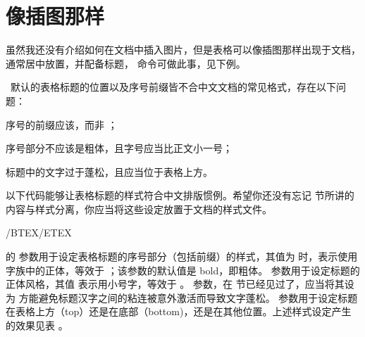 \section{像插图那样}

虽然我还没有介绍如何在文档中插入图片，但是表格可以像插图那样出现于文档，通常居中放置，并配备标题， 命令可做此事，见下例。

\mainlanguage[en]
\startexample
{}
\stopexample
\simpleexample[option=TEX]{\null}
\getexample

\CONTEXT\ 默认的表格标题的位置以及序号前缀皆不合中文文档的常见格式，存在以下问题：

\startitemize[packed]
\item 序号的前缀应该，而非 ；
\item 序号部分不应该是粗体，且字号应当比正文小一号；
\item 标题中的文字过于蓬松，且应当位于表格上方。
\stopitemize

以下代码能够让表格标题的样式符合中文排版惯例。希望你还没有忘记 \in[style] 节所讲的内容与样式分离，你应当将这些设定放置于文档的样式文件。

\startTEX
\mainlanguage[cn]/BTEX/ETEX

\setupcaption
  [table][headstyle=normal, style=small, align=center, location=top]
\stopTEX

\noindent {} 的  参数用于设定表格标题的序号部分（包括前缀）的样式，其值为  时，表示使用字族中的正体，等效于 \tex{\rm}；该参数的默认值是 bold，即粗体。 参数用于设定标题的正体风格，其值  表示用小号字，等效于 \tex{\tfx}。 参数，在 \in[essay] 节已经见过了，应当将其设为  方能避免标题汉字之间的粘连被意外激活而导致文字蓬松。 参数用于设定标题在表格上方（top）还是在底部（bottom)，还是在其他位置。上述样式设定产生的效果见表 。

\mainlanguage[cn]
\setupcaption
  [table]
  [headstyle=normal, style=\tfx, align=center, location=top]

